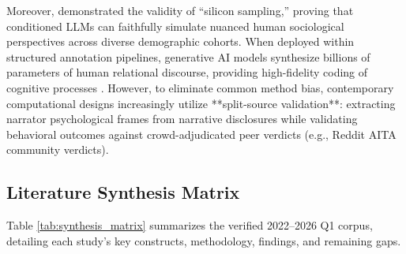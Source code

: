 Moreover, \citet{argyle2023out} demonstrated the validity of ``silicon sampling,'' proving that conditioned LLMs can faithfully simulate nuanced human sociological perspectives across diverse demographic cohorts. When deployed within structured annotation pipelines, generative AI models synthesize billions of parameters of human relational discourse, providing high-fidelity coding of cognitive processes \citep{grossmann2023ai,grossmann2024generative}. However, to eliminate common method bias, contemporary computational designs increasingly utilize **split-source validation**: extracting narrator psychological frames from narrative disclosures while validating behavioral outcomes against crowd-adjudicated peer verdicts (e.g., Reddit AITA community verdicts).

\subsection{Literature Synthesis Matrix}
Table \ref{tab:synthesis_matrix} summarizes the verified 2022--2026 Q1 corpus, detailing each study's key constructs, methodology, findings, and remaining gaps.

